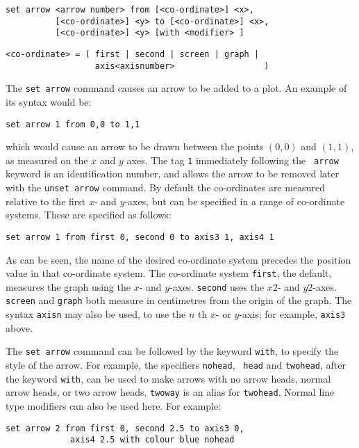 \begin{verbatim}
set arrow <arrow number> from [<co-ordinate>] <x>,
          [<co-ordinate>] <y> to [<co-ordinate>] <x>,
          [<co-ordinate>] <y> [with <modifier> ]
\end{verbatim}

\begin{verbatim}
<co-ordinate> = ( first | second | screen | graph |
                  axis<axisnumber>                  )
\end{verbatim}

The {\tt set arrow} command causes an arrow to be added to a plot. An example of
its syntax would be:

\begin{verbatim}
set arrow 1 from 0,0 to 1,1
\end{verbatim}

\noindent which would cause an arrow to be drawn between the points $(0,0)$ and $(1,1)$, as
measured on the $x$ and $y$ axes.  The tag {\tt 1} immediately following the {\tt
arrow} keyword is an identification number, and allows the arrow to be removed
later with the {\tt unset arrow} command.  By default the co-ordinates are
measured relative to the first $x$- and $y$-axes, but can be specified in a range
of co-ordinate systems. These are specified as follows:

\begin{verbatim}
set arrow 1 from first 0, second 0 to axis3 1, axis4 1
\end{verbatim}

As can be seen, the name of the desired co-ordinate system precedes the position
value in that co-ordinate system. The co-ordinate system {\tt first}, the default,
measures the graph using the $x$- and $y$-axes. {\tt second} uses the $x2$- and
$y2$-axes.  {\tt screen} and {\tt graph} both measure in centimetres from the
origin of the graph.  The syntax {\tt axisn} may also be
used, to use the $n$ th $x$- or $y$-axis; for example, {\tt axis3} above.

The {\tt set arrow} command can be followed by the keyword {\tt with}, to
specify the style of the arrow. For example, the specifiers {\tt nohead}, {\tt
head} and {\tt twohead}, after the keyword {\tt with}, can be used to make
arrows with no arrow heads, normal arrow heads, or two arrow heads. {\tt twoway}
is an alias for {\tt twohead}.  Normal line type modifiers can also be used
here.  For example:

\begin{verbatim}
set arrow 2 from first 0, second 2.5 to axis3 0,
             axis4 2.5 with colour blue nohead
\end{verbatim}



